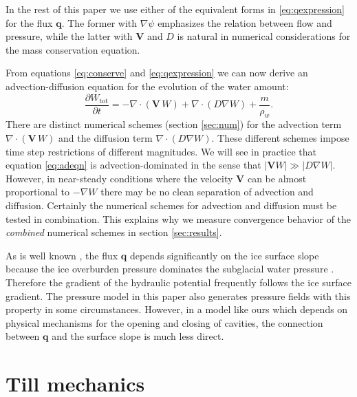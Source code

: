 \documentclass[11pt,final]{amsart}
\newcommand\bV{\mathbf{V}}
\newcommand\bq{\mathbf{q}}
\newcommand{\Div}{\nabla\cdot}
\newcommand{\grad}{\nabla}
\newcommand{\Wtot}{W_{\text{tot}}}
\begin{document}
In the rest of this paper we use either of the equivalent forms in \eqref{eq:qexpression} for the flux $\bq$.  The former with $\grad \psi$ emphasizes the relation between flow and pressure, while the latter with $\bV$ and $D$ is natural in numerical considerations for the mass conservation equation.

From equations \eqref{eq:conserve} and \eqref{eq:qexpression} we can now derive an advection-diffusion equation \citep{HundsdorferVerwer2010} for the evolution of the water amount:
\begin{equation} \label{eq:adeqn}
  \frac{\partial \Wtot}{\partial t} = - \Div\left(\bV\, W\right) + \Div \left(D \grad W\right) + \frac{m}{\rho_w}.
\end{equation}
There are distinct numerical schemes (section \ref{sec:num}) for the advection term $\Div\left(\bV\, W\right)$ and the diffusion term $\Div \left(D \grad W\right)$.  These different schemes impose time step restrictions of different magnitudes.  We will see in practice that equation \eqref{eq:adeqn} is advection-dominated in the sense that $|\bV W| \gg |D \grad W|$.  However, in near-steady conditions where the velocity $\bV$ can be almost proportional to $-\grad W$ there may be no clean separation of advection and diffusion.  Certainly the numerical schemes for advection and diffusion must be tested in combination.  This explains why we measure convergence behavior of the \emph{combined} numerical schemes in section \ref{sec:results}.

As is well known \citep{Clarke05}, the flux $\bq$ depends significantly on the ice surface slope because the ice overburden pressure dominates the subglacial water pressure \citep{Shreve1972}.  Therefore the gradient of the hydraulic potential frequently follows the ice surface gradient.  The pressure model in this paper also generates pressure fields with this property in some circumstances.  However, in a model like ours which depends on physical mechanisms for the opening and closing of cavities, the connection between $\bq$ and the surface slope is much less direct.



\section{Till mechanics} \label{sec:tillmechanics}
\end{document}
